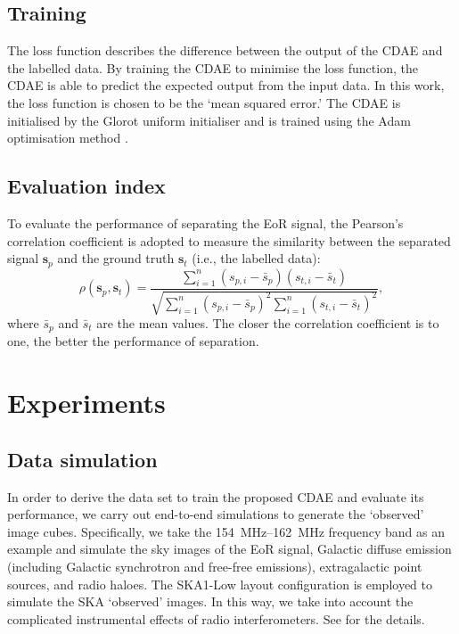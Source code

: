 \documentclass[letters,a4paper,fleqn,usenatbib]{mnras}
\begin{document}
\subsection{Training}
\label{sec:training}

The loss function describes the difference between the output of the
CDAE and the labelled data.
By training the CDAE to minimise the loss function, the CDAE is able
to predict the expected output from the input data.
In this work, the loss function is chosen to be the `mean squared error.'
The CDAE is initialised by the Glorot uniform initialiser \citep{glorot2010}
and is trained using the Adam optimisation method \citep{kingma2015}.


\subsection{Evaluation index}
\label{sec:index}

To evaluate the performance of separating the EoR signal, the Pearson's
correlation coefficient is adopted to measure the similarity between
the separated signal $\mathbf{s}_p$ and the ground truth $\mathbf{s}_t$
(i.e., the labelled data):
\begin{equation}
  \label{eq:corrcoef}
  \rho(\mathbf{s}_p, \mathbf{s}_t) =
    \frac{\sum_{i=1}^{n}(s_{p,i}-\bar{s}_p)(s_{t,i}-\bar{s}_t)}{
      \sqrt{\sum_{i=1}^{n}(s_{p,i}-\bar{s}_p)^2
        \sum_{i=1}^{n}(s_{t,i}-\bar{s}_t)^2}
    },
\end{equation}
where $\bar{s}_p$ and $\bar{s}_t$ are the mean values.
The closer the correlation coefficient is to one, the better the
performance of separation.


\section{Experiments}
\label{sec:experiments}

\subsection{Data simulation}
\label{sec:simulation}

In order to derive the data set to train the proposed CDAE and evaluate
its performance, we carry out end-to-end simulations to generate the
`observed' image cubes.
Specifically, we take the \SIrange{154}{162}{\MHz} frequency band as an
example and simulate the sky images of the EoR signal, Galactic diffuse
emission (including Galactic synchrotron and free-free emissions),
extragalactic point sources, and radio haloes.
The SKA1-Low layout configuration is employed to simulate the SKA
`observed' images.
In this way, we take into account the complicated instrumental effects
of radio interferometers.
See \citet{li2018} for the details.
\end{document}
